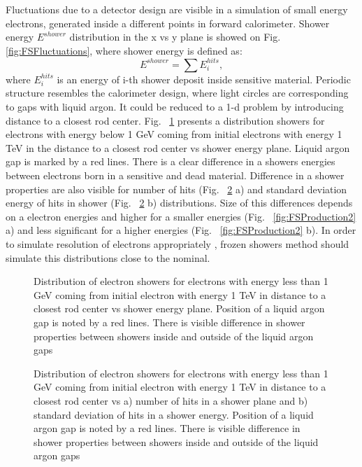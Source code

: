 Fluctuations due to a detector design are visible in a simulation of small energy electrons, generated inside a different points in forward calorimeter. Shower energy $E^{shower}$ distribution in the x vs y plane is showed on Fig. \ref{fig:FSFluctuations}, where shower energy is defined as:
\begin{equation}
E^{shower}=\sum E_i^{hits},
\end{equation}
where $E_i^{hits}$ is an energy of i-th shower deposit inside sensitive material. Periodic structure resembles the calorimeter design, where light circles are corresponding to gaps with liquid argon. It could be reduced to a 1-d problem by introducing distance to a closest rod center. Fig. ~\ref{fig:FSProduction} presents a distribution showers for electrons with energy below 1 GeV coming from initial electrons with energy 1 TeV in the distance to a closest rod center vs shower energy plane. Liquid argon gap is marked by a red lines. There is a clear difference in a showers energies between electrons born in a sensitive and dead material. Difference in a shower properties are also visible for number of hits  (Fig. ~\ref{fig:ShowerProp} a) and standard deviation energy of hits in shower (Fig. ~\ref{fig:ShowerProp} b) distributions. Size of this differences depends on a electron energies and higher for a smaller energies (Fig. ~\ref{fig:FSProduction2} a) and less significant for a higher energies (Fig. ~\ref{fig:FSProduction2} b).  In order to simulate resolution of electrons appropriately , frozen showers method should simulate this distributions close to the nominal. 

\begin{figure}[!tbp]
\caption{Distribution of electron showers for electrons with energy less than 1 GeV coming from initial electron with energy 1 TeV in distance to a closest rod center vs shower energy plane. Position of a liquid argon gap is noted by a red lines. There is visible difference in shower properties between showers inside and outside of the liquid argon gaps}
\label{fig:FSProduction}
\end{figure}

\begin{figure}[!tbp]
\begin{minipage}[h]{0.49\linewidth}
\end{minipage}
\hfill
\begin{minipage}[h]{0.49\linewidth}
\end{minipage}
\caption{Distribution of electron showers for electrons with energy less than 1 GeV coming from initial electron with energy 1 TeV in distance to a closest rod center vs a) number of hits in a shower plane and b) standard deviation of hits in a shower energy. Position of a liquid argon gap is noted by a red lines. There is visible difference in shower properties between showers inside and outside of the liquid argon gaps}
\label{fig:ShowerProp}
\end{figure}

